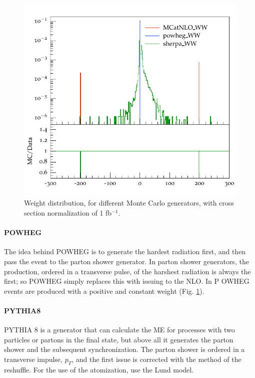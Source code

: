  
 
\begin{figure}
\centering
\includegraphics[scale= 0.7]{../Cap3/Fig_MC/weight}
\caption{Weight distribution, for different Monte Carlo generators, with cross section normalization of 1 fb$^{-1}$.}
\label{weight}
\end{figure}
 
 
\paragraph{P{\footnotesize OWHEG}} The idea behind P{\footnotesize OWHEG} \cite{Oleari:2010nx} is to generate the hardest radiation first, and then pass the event to the parton shower generator. In parton shower generators, the production, ordered in a transverse pulse, of the harshest radiation is always the first; so P{\footnotesize OWHEG} simply replaces this with issuing to the NLO.
In P {\footnotesize OWHEG} events are produced with a positive and constant weight (Fig. \ref{weight}).
 
 
\paragraph{P{\footnotesize YTHIA}8 } P{\footnotesize YTHIA 8} \cite{bib:pythia} is a generator that can calculate the ME for processes with two particles or partons in the final state, but above all it generates the parton shower and the subsequent synchronization. The parton shower is ordered in a transverse impulse, $ p_T $, and the first issue is corrected with the method of the reshuffle. For the use of the atomization, use the Lund model.
 
